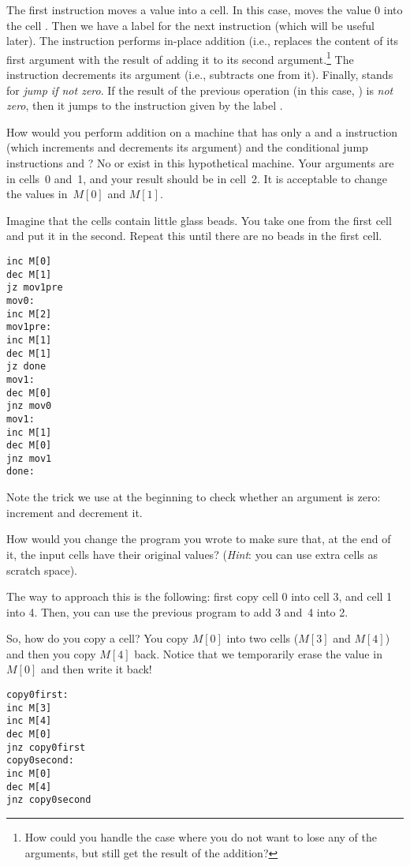 The first instruction  moves a value into a cell. In this
case, moves the value 0 into the cell . Then we have a label
for the next instruction (which will be useful later). The 
instruction performs in-place addition (i.e., replaces the content of its first
argument with the result of adding it to its second argument.\footnote{How could
you handle the case where you do not want to lose any of the arguments, but
still get the result of the addition?} The  instruction
decrements its argument (i.e., subtracts one from it). Finally,
 stands for \emph{jump if not zero}. If the result of the
previous operation (in this case, ) is \emph{not zero}, then
it jumps to the instruction given by the label .

\begin{exercise}
How would you perform addition on a machine that has only a 
and a  instruction (which increments and decrements its
argument) and the conditional jump instructions  and
? No  or  exist in this
hypothetical machine. Your arguments are in cells~0 and~1, and your result
should be in cell~2. It is acceptable to change the values in~$M[0]$ and
$M[1]$.
\begin{solution}
Imagine that the cells contain little glass beads. You take one from the first
cell and put it in the second. Repeat this until there are no beads in the
first cell.

\begin{verbatim}
inc M[0]
dec M[1]
jz mov1pre
mov0:
inc M[2]
mov1pre:
inc M[1]
dec M[1]
jz done
mov1:
dec M[0]
jnz mov0
mov1:
inc M[1]
dec M[0]
jnz mov1
done:
\end{verbatim}

Note the trick we use at the beginning to check whether an argument is zero:
increment and decrement it.
\end{solution}
\end{exercise}

\begin{exercise}
How would you change the program you wrote to make sure that, at the end of it,
the input cells have their original values? (\emph{Hint}: you can use extra
cells as scratch space).
\begin{solution}
The way to approach this is the following: first copy cell 0 into cell 3, and
cell 1 into 4. Then, you can use the previous program to add 3 and~4 into 2.

So, how do you copy a cell? You copy $M[0]$ into two cells ($M[3]$ and $M[4]$)
and then you copy $M[4]$ back. Notice that we temporarily erase the value in
$M[0]$ and then write it back!

\begin{verbatim}
copy0first:
inc M[3]
inc M[4]
dec M[0]
jnz copy0first
copy0second:
inc M[0]
dec M[4]
jnz copy0second
\end{verbatim}
\end{solution}
\end{exercise}

